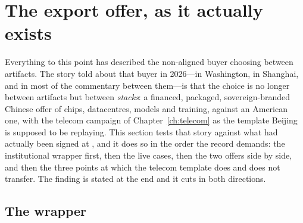 \section{The export offer, as it actually exists}
\label{sec:export-offer}

Everything to this point has described the non-aligned buyer choosing between artifacts. The story told about that buyer in 2026---in Washington, in Shanghai, and in most of the commentary between them---is that the choice is no longer between artifacts but between \emph{stacks}: a financed, packaged, sovereign-branded Chinese offer of chips, datacentres, models and training, against an American one, with the telecom campaign of Chapter~\ref{ch:telecom} as the template Beijing is supposed to be replaying. This section tests that story against what had actually been signed at \datafreeze, and it does so in the order the record demands: the institutional wrapper first, then the live cases, then the two offers side by side, and then the three points at which the telecom template does and does not transfer. The finding is stated at the end and it cuts in both directions.

\subsection{The wrapper}

